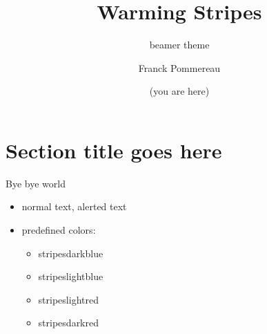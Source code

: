 \documentclass{beamer}
\begin{document}
\title{Warming Stripes}
\subtitle{beamer theme}
\author{Franck Pommereau}
\date{\color{stripesdarkred}(you are here)}

\maketitle

\section{Section title goes here}

\begin{frame}{Bye bye world}
  \begin{itemize}
  \item normal text, \alert{alerted text}
  \item predefined colors:
    \begin{itemize}
    \item {\color{stripesdarkblue}stripesdarkblue}
    \item {\color{stripeslightblue}stripeslightblue}
    \item {\color{stripeslightred}stripeslightred}
    \item {\color{stripesdarkred}stripesdarkred}
    \end{itemize}
  \end{itemize}
\end{frame}
\end{document}
